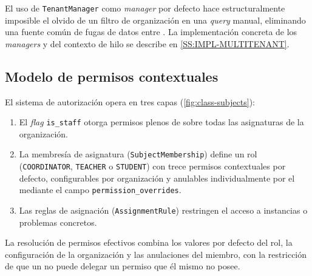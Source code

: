 El uso de \texttt{TenantManager} como \textit{manager} por defecto
hace estructuralmente imposible el olvido de un filtro de organización
en una \textit{query} manual, eliminando una fuente común de fugas de
datos entre . La implementación concreta de los
\textit{managers} y del contexto de hilo se describe en
\cref{SS:IMPL-MULTITENANT}.


\subsection{Modelo de permisos contextuales}
\label{SS:DES-PERMISSIONS}

El sistema de autorización opera en tres capas
(\cref{fig:class-subjects}):

\begin{enumerate}
  \item El \textit{flag} \texttt{is\_staff} otorga permisos plenos de
   sobre todas las asignaturas de la organización.

  \item La membresía de asignatura (\texttt{SubjectMembership}) define un
  rol (\texttt{COORDINATOR}, \texttt{TEACHER} o \texttt{STUDENT}) con
  trece permisos contextuales por defecto, configurables por organización
  y anulables individualmente por el  mediante el campo
  \texttt{permission\_overrides}.

  \item Las reglas de asignación (\texttt{AssignmentRule}) restringen el
  acceso a instancias o problemas concretos.
\end{enumerate}

La resolución de permisos efectivos combina los valores por defecto del
rol, la configuración de la organización y las anulaciones del miembro,
con la restricción de que un  no puede delegar un
permiso que él mismo no posee.
